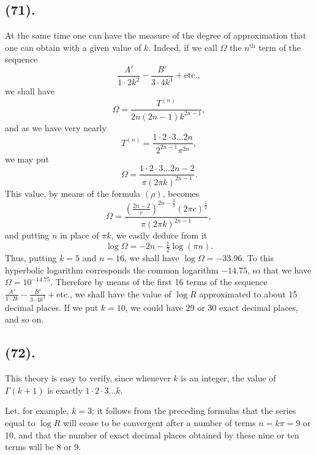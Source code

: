 \documentclass{article}
\begin{document}
\subsection*{(71).}

At the same time one can have the measure of the degree of approximation that one can obtain with a given value of $k$. Indeed, if we call $\Omega$ the $n^{\text{th}}$ term of the sequence
\[ \frac{A'}{1\cdot2k^{2}}-\frac{B'}{3\cdot4k^{3}}+\text{etc.}, \]
we shall have
\[ \Omega=\frac{T^{(n)}}{2n(2n-1)k^{2n-1}}, \]
and as we have very nearly
\[ T^{(n)}=\frac{1\cdot2\cdot3\ldots2n}{2^{2n-1}\pi^{2n}}, \]
we may put
\[ \Omega=\frac{1\cdot2\cdot3\ldots2n-2}{\pi(2\pi k)^{2n-1}}. \]
This value, by means of the formula $(\rho)$, becomes
\[ \Omega=\frac{\left(\frac{2n-2}{e}\right)^{2n-\frac{3}{2}}(2\pi e)^{\frac{1}{2}}}{\pi(2\pi k)^{2n-1}}, \]
and putting $n$ in place of $\pi k$, we easily deduce from it
\[ \log\Omega=-2n-\tfrac{1}{2}\log(\pi n). \]
Thus, putting $k=5$ and $n=16$, we shall have $\log\Omega=-33.96$. To this hyperbolic logarithm corresponds the common logarithm $-14.75$, so that we have $\Omega=10^{-14.75}$. Therefore by means of the first 16 terms of the sequence $\frac{A'}{1\cdot2k}-\frac{B'}{3\cdot4k^{3}}+\text{etc.}$, we shall have the value of $\log R$ approximated to about 15 decimal places. If we put $k=10$, we could have 29 or 30 exact decimal places, and so on.

\subsection*{(72).}

This theory is easy to verify, since whenever $k$ is an integer, the value of $\Gamma(k+1)$ is exactly $1\cdot2\cdot3\ldots k$.


Let, for example, $k=3$; it follows from the preceding formulas that the series equal to $\log R$ will cease to be convergent after a number of terms $n=k\pi=9$ or 10, and that the number of exact decimal places obtained by these nine or ten terms will be 8 or 9.
\end{document}

